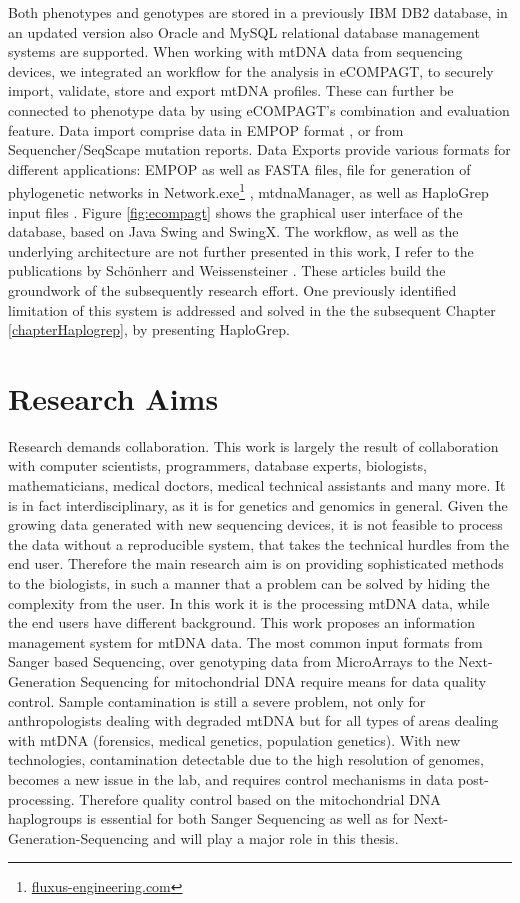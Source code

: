 Both phenotypes and genotypes are stored in a previously IBM DB2 database, in an updated version also Oracle and MySQL relational database management systems are supported. When working with mtDNA data from sequencing devices, we integrated an workflow for the analysis in eCOMPAGT, to securely import, validate, store and export mtDNA profiles.  These can further be connected to phenotype data by using eCOMPAGT's combination and evaluation feature. Data import comprise data in EMPOP format \cite{Parson2007}, or from Sequencher/SeqScape mutation reports. Data Exports provide various formats for different applications: EMPOP as well as FASTA files, file for generation of phylogenetic networks in Network.exe\footnote{\url{fluxus-engineering.com}}  \cite{Bandelt1999}, mtdnaManager\cite{Lee2008}, as well as HaploGrep input files \cite{Kloss-Brandstatter2011,Weissensteiner2016a}. Figure \ref{fig:ecompagt} shows the graphical user interface of the database, based on Java Swing and SwingX. The workflow, as well as the underlying architecture are not further presented in this work, I refer to the publications by Sch\"onherr and Weissensteiner \cite{Schoenherr2009,Weissensteiner2010}. These articles build the groundwork of the subsequently research effort. One previously identified limitation of this system is addressed and solved in the the subsequent Chapter \ref{chapterHaplogrep}, by presenting HaploGrep.



\section{Research Aims}
Research demands collaboration. This work is largely the result of collaboration with computer scientists, programmers, database experts, biologists, mathematicians, medical doctors, medical technical assistants and many more. It is in fact interdisciplinary, as it is for genetics and genomics in general. Given the growing data generated with new sequencing devices, it is not feasible to process the data without a reproducible system, that takes the technical hurdles from the end user. Therefore the main research aim is on providing sophisticated methods to the biologists, in such a manner that a problem can be solved by hiding the complexity from the user. In this work it is the processing mtDNA data, while the end users have different background. This work proposes an information management system for mtDNA data. 
The most common input formats from Sanger based Sequencing, over genotyping data from MicroArrays to the Next-Generation Sequencing for mitochondrial DNA require means for data quality control. Sample contamination is still a severe problem, not only for anthropologists dealing with degraded mtDNA but for all types of areas dealing with mtDNA (forensics, medical genetics, population genetics). With new technologies, contamination detectable due to the high resolution of genomes, becomes a new issue in the lab, and requires control mechanisms in data post-processing. Therefore quality control based on the mitochondrial DNA haplogroups is essential for both Sanger Sequencing as well as for Next-Generation-Sequencing and will play a major role in this thesis.

